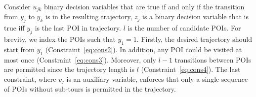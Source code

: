 Consider $u_{jk}$ binary decision variables that are true if and only if
the transition from $y_j$ to $y_k$ is in the resulting trajectory,
$z_j$ is a binary decision variable that is true iff $y_j$ is the last POI in trajectory.
$l$ is the number of candidate POIs.
For brevity, we index the POIs such that $y_1 = 1$.
Firstly, the desired trajectory should start from $y_1$ (Constraint~\ref{eq:cons2}).
In addition, any POI could be visited at most once (Constraint~\ref{eq:cons3}).
Moreover, only $l-1$ transitions between POIs are permitted
since the trajectory length is $l$ (Constraint~\ref{eq:cons4}).
The last constraint, where $v_j$ is an auxiliary variable,
enforces that only a single sequence of POIs without sub-tours is permitted in the trajectory.


